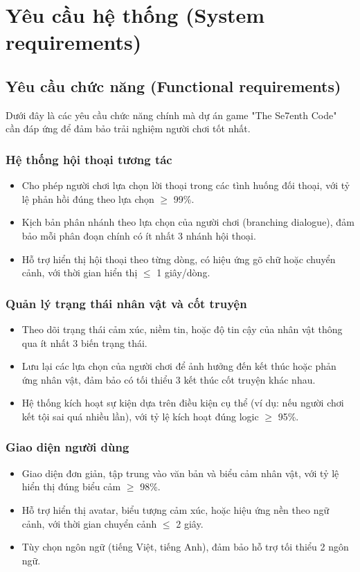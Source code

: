 \section{Yêu cầu hệ thống (System requirements)}
\subsection{Yêu cầu chức năng (Functional requirements)}
Dưới đây là các yêu cầu chức năng chính mà dự án game "The Se7enth Code" cần đáp ứng để đảm bảo trải nghiệm người chơi tốt nhất.

\subsubsection{Hệ thống hội thoại tương tác}
\begin{itemize}
    \item Cho phép người chơi lựa chọn lời thoại trong các tình huống đối thoại, với tỷ lệ phản hồi đúng theo lựa chọn $\geq$ 99\%.
    \item Kịch bản phân nhánh theo lựa chọn của người chơi (branching dialogue), đảm bảo mỗi phân đoạn chính có ít nhất 3 nhánh hội thoại.
    \item Hỗ trợ hiển thị hội thoại theo từng dòng, có hiệu ứng gõ chữ hoặc chuyển cảnh, với thời gian hiển thị $\leq$ 1 giây/dòng.
\end{itemize}

\subsubsection{Quản lý trạng thái nhân vật và cốt truyện}
\begin{itemize}
    \item Theo dõi trạng thái cảm xúc, niềm tin, hoặc độ tin cậy của nhân vật thông qua ít nhất 3 biến trạng thái.
    \item Lưu lại các lựa chọn của người chơi để ảnh hưởng đến kết thúc hoặc phản ứng nhân vật, đảm bảo có tối thiểu 3 kết thúc cốt truyện khác nhau.
    \item Hệ thống kích hoạt sự kiện dựa trên điều kiện cụ thể (ví dụ: nếu người chơi kết tội sai quá nhiều lần), với tỷ lệ kích hoạt đúng logic $\geq$ 95\%.
\end{itemize}

\subsubsection{Giao diện người dùng}
\begin{itemize}
    \item Giao diện đơn giản, tập trung vào văn bản và biểu cảm nhân vật, với tỷ lệ hiển thị đúng biểu cảm $\geq$ 98\%.
    \item Hỗ trợ hiển thị avatar, biểu tượng cảm xúc, hoặc hiệu ứng nền theo ngữ cảnh, với thời gian chuyển cảnh $\leq$ 2 giây.
    \item Tùy chọn ngôn ngữ (tiếng Việt, tiếng Anh), đảm bảo hỗ trợ tối thiểu 2 ngôn ngữ.
\end{itemize}

